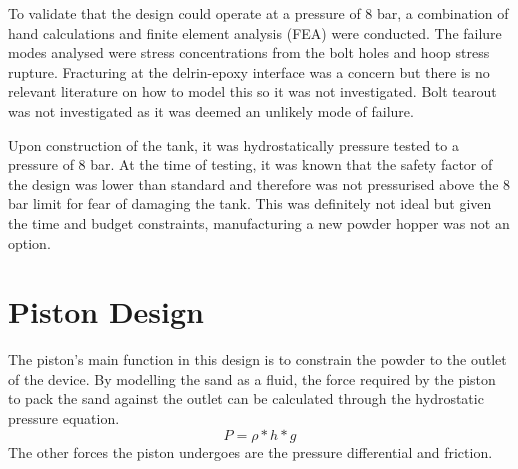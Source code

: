 To validate that the design could operate at a pressure of 8 bar, a combination of hand calculations and finite element analysis (FEA) were conducted. The failure modes analysed were stress concentrations from the bolt holes and hoop stress rupture. Fracturing at the delrin-epoxy interface was a concern but there is no relevant literature on how to model this so it was not investigated. Bolt tearout was not investigated as it was deemed an unlikely mode of failure.

Upon construction of the tank, it was hydrostatically pressure tested to a pressure of 8 bar. At the time of testing, it was known that the safety factor of the design was lower than standard and therefore was not pressurised above the 8 bar limit for fear of damaging the tank. This was definitely not ideal but given the time and budget constraints, manufacturing a new powder hopper was not an option.
\newpage
\section{Piston Design}
The piston's main function in this design is to constrain the powder to the outlet of the device. By modelling the sand as a fluid, the force required by the piston to pack the sand against the outlet can be calculated through the hydrostatic pressure equation. 
\begin{equation}\label{equ:hydrostatic}
P = \rho * h * g
\end{equation}
The other forces the piston undergoes are the pressure differential and friction.

